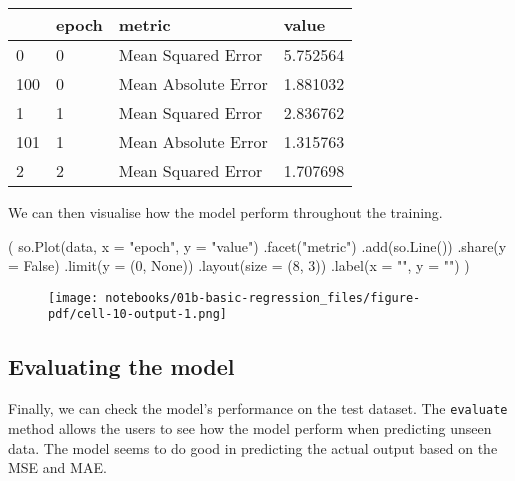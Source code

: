 \documentclass[
  letterpaper,
  DIV=11,
  numbers=noendperiod]{scrreprt}
\newenvironment{Shaded}{\begin{snugshade}}{\end{snugshade}}
\newcommand{\DecValTok}[1]{\textcolor[rgb]{0.68,0.00,0.00}{#1}}
\newcommand{\NormalTok}[1]{\textcolor[rgb]{0.00,0.23,0.31}{#1}}
\newcommand{\OperatorTok}[1]{\textcolor[rgb]{0.37,0.37,0.37}{#1}}
\newcommand{\StringTok}[1]{\textcolor[rgb]{0.13,0.47,0.30}{#1}}
\newcommand{\VariableTok}[1]{\textcolor[rgb]{0.07,0.07,0.07}{#1}}
\begin{document}
\begin{longtable}[]{@{}llll@{}}
\toprule()
& epoch & metric & value \\
\midrule()
\endhead
0 & 0 & Mean Squared Error & 5.752564 \\
100 & 0 & Mean Absolute Error & 1.881032 \\
1 & 1 & Mean Squared Error & 2.836762 \\
101 & 1 & Mean Absolute Error & 1.315763 \\
2 & 2 & Mean Squared Error & 1.707698 \\
\bottomrule()
\end{longtable}

We can then visualise how the model perform throughout the training.

\begin{Shaded}
\begin{Highlighting}[]
\NormalTok{(}
\NormalTok{    so.Plot(data, x }\OperatorTok{=} \StringTok{"epoch"}\NormalTok{, y }\OperatorTok{=} \StringTok{"value"}\NormalTok{)}
\NormalTok{    .facet(}\StringTok{"metric"}\NormalTok{)}
\NormalTok{    .add(so.Line())}
\NormalTok{    .share(y }\OperatorTok{=} \VariableTok{False}\NormalTok{)}
\NormalTok{    .limit(y }\OperatorTok{=}\NormalTok{ (}\DecValTok{0}\NormalTok{, }\VariableTok{None}\NormalTok{))}
\NormalTok{    .layout(size }\OperatorTok{=}\NormalTok{ (}\DecValTok{8}\NormalTok{, }\DecValTok{3}\NormalTok{))}
\NormalTok{    .label(x }\OperatorTok{=} \StringTok{""}\NormalTok{, y }\OperatorTok{=} \StringTok{""}\NormalTok{)}
\NormalTok{)}
\end{Highlighting}
\end{Shaded}

\begin{figure}[H]

{\centering \texttt{[image: notebooks/01b-basic-regression\_files/figure-pdf/cell-10-output-1.png]}

}

\end{figure}

\hypertarget{evaluating-the-model}{%
\subsection{Evaluating the model}\label{evaluating-the-model}}

Finally, we can check the model's performance on the test dataset. The
\texttt{evaluate} method allows the users to see how the model perform
when predicting unseen data. The model seems to do good in predicting
the actual output based on the MSE and MAE.
\end{document}
